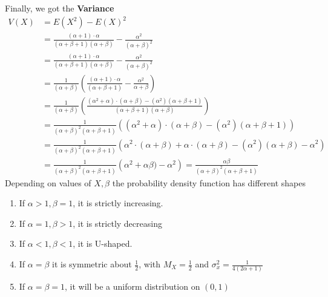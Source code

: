 \documentclass[11pt,oneside]{book}
\theoremstyle{break}
\theoremstyle{break}
\begin{document}
Finally, we got the \textbf{Variance}\begin{align*}
V(X)&=E(X^2)-E(X)^2\\
&=\frac{(\alpha +1)\cdot \alpha }{ (\alpha+\beta+1)(\alpha+\beta)}-\frac{\alpha^2}{(\alpha+\beta)^2}\\
&=\frac{(\alpha +1)\cdot \alpha }{ (\alpha+\beta+1)(\alpha+\beta)}-\frac{\alpha^2}{(\alpha+\beta)^2}\\
&=\frac{1}{(\alpha+\beta)}\left(\frac{(\alpha +1)\cdot \alpha }{ (\alpha+\beta+1)}-\frac{\alpha^2}{\alpha+\beta} \right)\\
&=\frac{1}{(\alpha+\beta)}\left(\frac{(\alpha^2 +\alpha)\cdot (\alpha+\beta) -(\alpha^2)(\alpha+\beta+1)}{ (\alpha+\beta+1)(\alpha+\beta)} \right)\\
&=\frac{1}{(\alpha+\beta)^2(\alpha+\beta+1)}\left((\alpha^2 +\alpha)\cdot (\alpha+\beta) -(\alpha^2)(\alpha+\beta+1) \right)\\
&=\frac{1}{(\alpha+\beta)^2(\alpha+\beta+1)}\left(\alpha^2\cdot (\alpha+\beta) +\alpha\cdot (\alpha+\beta) -(\alpha^2)(\alpha+\beta)-\alpha^2 \right)\\
&=\frac{1}{(\alpha+\beta)^2(\alpha+\beta+1)}\left( \alpha^2+\alpha \beta) -\alpha^2 \right)=\frac{\alpha\beta}{(\alpha+\beta)^2(\alpha+\beta+1)}
\end{align*}
Depending on values of $X,\beta$ the probability density function has different shapes \begin{enumerate}
\item If $\alpha>1,\beta=1$, it is strictly increasing.
\item If $\alpha=1,\beta>1$, it is strictly decreasing
\item If $\alpha<1,\beta<1$, it is U-shaped.
\item If $\alpha=\beta$ it is symmetric about $\frac{1}{2}$, with $M_X=\frac{1}{2}$ and $\sigma_x^2=\frac{1}{4(2\alpha+1)}$
\item If $\alpha=\beta=1$, it will be a uniform distribution on $(0,1)$
\end{enumerate}
\end{document}
